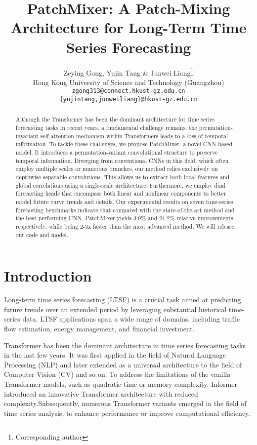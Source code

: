 \documentclass{article} \usepackage{iclr2024_conference,times}
\title{PatchMixer: A Patch-Mixing Architecture for Long-Term Time Series Forecasting}
\author{Zeying Gong, Yujin Tang \& Junwei Liang\thanks{Corresponding author} \\
Hong Kong University of Science and Technology (Guangzhou)\\
\texttt{zgong313@connect.hkust-gz.edu.cn}\\
\texttt{\{yujintang,junweiliang\}@hkust-gz.edu.cn} 
}
\begin{document}
\maketitle

\begin{abstract}




Although the Transformer has been the dominant architecture for time series forecasting tasks in recent years, a fundamental challenge remains: the permutation-invariant self-attention mechanism within Transformers leads to a loss of temporal information. 
To tackle these challenges, we propose PatchMixer, a novel CNN-based model. It introduces a permutation-variant convolutional structure to preserve temporal information. Diverging from conventional CNNs in this field, which often employ multiple scales or numerous branches, our method relies exclusively on depthwise separable convolutions. This allows us to extract both local features and global correlations using a single-scale architecture. Furthermore, we employ dual forecasting heads that encompass both linear and nonlinear components to better model future curve trends and details.
Our experimental results on seven time-series forecasting benchmarks indicate that compared with the state-of-the-art method and the best-performing CNN, PatchMixer yields $3.9\%$ and $21.2\%$ relative improvements, respectively, while being 2-3x faster than the most advanced method.
We will release our code and model.

\end{abstract}

\section{Introduction}

Long-term time series forecasting (LTSF) is a crucial task aimed at predicting future trends over an extended period by leveraging substantial historical time-series data.
LTSF applications span a wide range of domains, including traffic flow estimation, energy management, and financial investment.



Transformer \citep{transformer} has been the dominant architecture in time series forecasting tasks in the last few years. 
It was first applied in the field of Natural Language Processing (NLP) and later extended as a universal architecture to the field of Computer Vision (CV) and so on. To address the limitations of the vanilla Transformer models, such as quadratic time or memory complexity, Informer \citep{informer} introduced an innovative Transformer architecture with reduced complexity.Subsequently, numerous Transformer variants \citep{autoformer, fedformer, pyraformer} emerged in the field of time series analysis, to enhance performance or improve computational efficiency.
\end{document}
